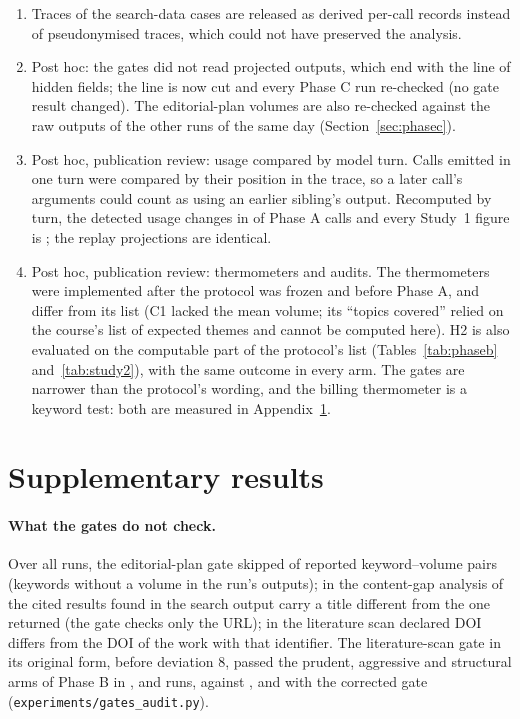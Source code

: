 \begin{enumerate}
\item Traces of the search-data cases are released as derived per-call records instead of pseudonymised traces,
  which could not have preserved the analysis.
\item Post hoc: the gates did not read projected outputs, which end with the line of hidden fields; the line is now
  cut and every Phase C run re-checked (no gate result changed). The editorial-plan volumes are also re-checked
  against the raw outputs of the other runs of the same day (Section~\ref{sec:phasec}).
\item Post hoc, publication review: usage compared by model turn. Calls emitted in one turn were compared by their
  position in the trace, so a later call's arguments could count as using an earlier sibling's output. Recomputed by
  turn, the detected usage changes in \TurnsCallsChanged{} of \TurnsCalls{} Phase A calls and every Study~1 figure is
  \TurnsFiguresUnchanged; the replay projections are identical.
\item Post hoc, publication review: thermometers and audits. The thermometers were implemented after the protocol was
  frozen and before Phase A, and differ from its list (C1 lacked the mean volume; its ``topics covered'' relied on the
  course's list of expected themes and cannot be computed here). H2 is also evaluated on the computable part of the protocol's list
  (Tables~\ref{tab:phaseb} and~\ref{tab:study2}), with the same outcome in every arm. The gates are narrower than the
  protocol's wording, and the billing thermometer is a keyword test: both are measured in
  Appendix~\ref{app:supplementary}.
\end{enumerate}

\section{Supplementary results}
\label{app:supplementary}

\paragraph{What the gates do not check.} Over all runs, the editorial-plan gate skipped \AuditCOneSkipped{} of
\AuditCOnePairs{} reported keyword--volume pairs (keywords without a volume in the run's outputs); in the content-gap
analysis \AuditCTwoDiffers{} of the \AuditCTwoFound{} cited results found in the search output carry a title different
from the one returned (the gate checks only the URL); in the literature scan \AuditCThreeDoi{} declared DOI differs from
the DOI of the work with that identifier. The literature-scan gate in its original form, before deviation 8, passed
the prudent, aggressive and structural arms of Phase B in \PhaseBOriginalGatesPrudentiii,
\PhaseBOriginalGatesAggressiveiii{} and \PhaseBOriginalGatesStructuraliii{} runs, against
\PhaseBNowGatesPrudentiii, \PhaseBNowGatesAggressiveiii{} and \PhaseBNowGatesStructuraliii{} with the corrected gate
(\texttt{experiments/gates\_audit.py}).

